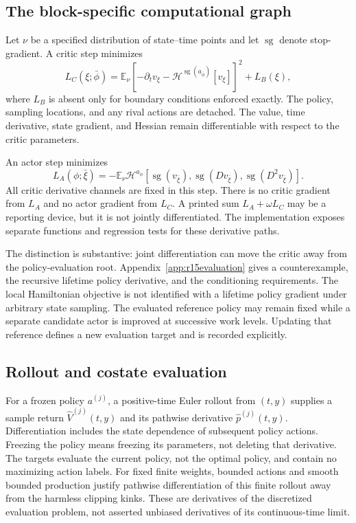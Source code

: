\documentclass[ecta,nameyear,draft]{econsocart}
\theoremstyle{definition}
\theoremstyle{remark}
\newcommand{\E}{\mathbb E}
\newcommand{\HH}{\mathcal H}
\newcommand{\sg}{\operatorname{sg}}
\begin{document}
\subsection{The block-specific computational graph}
Let $\nu$ be a specified distribution of state--time points and let $\sg$ denote stop-gradient. A critic step minimizes
\begin{equation}\label{eq:criticloss}
 L_C(\xi;\bar\phi)=\E_\nu\left[-\partial_t v_\xi-
                 \HH^{\sg(a_{\bar\phi})}[v_\xi]\right]^2+L_B(\xi),
\end{equation}
where $L_B$ is absent only for boundary conditions enforced exactly. The policy, sampling locations, and any rival actions are detached. The value, time derivative, state gradient, and Hessian remain differentiable with respect to the critic parameters.

An actor step minimizes
\begin{equation}\label{eq:actorloss}
 L_A(\phi;\bar\xi)=-\E_\nu\HH^{a_\phi}
 [\sg(v_{\bar\xi}),\sg(Dv_{\bar\xi}),\sg(D^2v_{\bar\xi})].
\end{equation}
All critic derivative channels are fixed in this step. There is no critic gradient from $L_A$ and no actor gradient from $L_C$. A printed sum $L_A+\omega L_C$ may be a reporting device, but it is not jointly differentiated. The implementation exposes separate functions and regression tests for these derivative paths.

The distinction is substantive: joint differentiation can move
the critic away from the policy-evaluation root. Appendix~\ref{app:r15evaluation}
gives a counterexample, the recursive lifetime policy derivative, and the
conditioning requirements. The local Hamiltonian objective is not identified
with a lifetime policy gradient under arbitrary state sampling.
The evaluated reference policy may remain fixed while a separate candidate
actor is improved at successive work levels. Updating that reference defines
a new evaluation target and is recorded explicitly.

\subsection{Rollout and costate evaluation}\label{sec:r11learning}
For a frozen policy $a^{(j)}$, a positive-time Euler rollout from $(t,y)$ supplies a sample return $\widehat V^{(j)}(t,y)$ and its pathwise derivative $\widehat p^{(j)}(t,y)$. Differentiation includes the state dependence of subsequent policy actions. Freezing the policy means freezing its parameters, not deleting that derivative. The targets evaluate the current policy, not the optimal policy, and contain no maximizing action labels. For fixed finite weights, bounded actions and smooth bounded production justify pathwise differentiation of this finite rollout away from the harmless clipping kinks. These are derivatives of the discretized evaluation problem, not asserted unbiased derivatives of its continuous-time limit.
\end{document}
